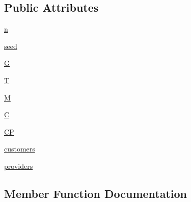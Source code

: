 \subsection*{Public Attributes}
\begin{DoxyCompactItemize}
\item 
\hyperlink{classnetworkx_1_1generators_1_1tests_1_1test__internet__as__graphs_1_1TestInternetASTopology_ab7265abc4ac39d1fb12806d9ed4ada09}{n}
\item 
\hyperlink{classnetworkx_1_1generators_1_1tests_1_1test__internet__as__graphs_1_1TestInternetASTopology_ac4012eabe10cec0348d5bf352c961720}{seed}
\item 
\hyperlink{classnetworkx_1_1generators_1_1tests_1_1test__internet__as__graphs_1_1TestInternetASTopology_adadc1230c28361966ac366cf0c69e2bf}{G}
\item 
\hyperlink{classnetworkx_1_1generators_1_1tests_1_1test__internet__as__graphs_1_1TestInternetASTopology_ab6cefb42bff234de31a8270bc9d6f50f}{T}
\item 
\hyperlink{classnetworkx_1_1generators_1_1tests_1_1test__internet__as__graphs_1_1TestInternetASTopology_af7bc065a80b8d9a38aeacded55d8bf94}{M}
\item 
\hyperlink{classnetworkx_1_1generators_1_1tests_1_1test__internet__as__graphs_1_1TestInternetASTopology_a5b5da1a168f392756e44ed47eabc2157}{C}
\item 
\hyperlink{classnetworkx_1_1generators_1_1tests_1_1test__internet__as__graphs_1_1TestInternetASTopology_a0ad13d3d1c9b401ea5af26cfa9f5a19f}{CP}
\item 
\hyperlink{classnetworkx_1_1generators_1_1tests_1_1test__internet__as__graphs_1_1TestInternetASTopology_ae694f8152e200bacdab2433accb842aa}{customers}
\item 
\hyperlink{classnetworkx_1_1generators_1_1tests_1_1test__internet__as__graphs_1_1TestInternetASTopology_a49e2a79b58841c0da723d15fc621653c}{providers}
\end{DoxyCompactItemize}


\subsection{Member Function Documentation}
\mbox{\label{classnetworkx_1_1generators_1_1tests_1_1test__internet__as__graphs_1_1TestInternetASTopology_a7316128fb676fe7e1a760ca1b4d4de2d}} 
